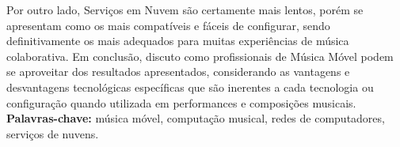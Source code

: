 \documentclass[11pt,twoside,a4paper]{book}
\begin{document}
	Por outro lado, Serviços em Nuvem são certamente mais lentos, porém se apresentam como os mais compatíveis e fáceis de configurar, sendo definitivamente os mais adequados para muitas experiências de música colaborativa.
	Em conclusão, discuto como profissionais de Música Móvel podem se aproveitar dos resultados apresentados, considerando as vantagens e desvantagens tecnológicas específicas que são inerentes a cada tecnologia ou configuração quando utilizada em performances e composições musicais.
	\\
	
	\noindent \textbf{Palavras-chave:} música móvel, computação musical, redes de computadores, serviços de nuvens.
	
	\tableofcontents    %
	
\end{document}
